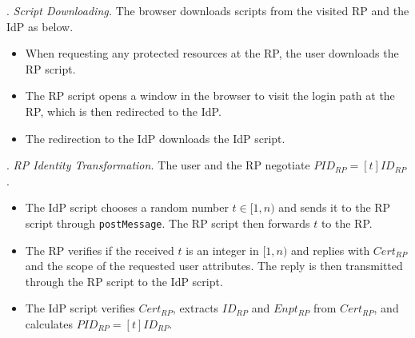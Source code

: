 \vspace{0.85mm}
. {\em Script Downloading.}
The browser downloads scripts from the visited RP and the IdP as below.
\vspace{-\topsep}
\begin{itemize}
\setlength{\topsep}{0pt}
\setlength{\partopsep}{0pt}
\setlength{\itemsep}{0pt}
\setlength{\parsep}{0pt}
\setlength{\parskip}{0pt}
\item[1.1]
When requesting any protected resources at the RP, the user downloads the RP script.
\item[1.2]
The RP script opens a window in the browser to visit the login path at the RP, which is then redirected to the IdP.
\item[1.3]
The redirection to the IdP downloads the IdP script.
\end{itemize}



. {\em RP Identity Transformation.}
The user and the RP negotiate $PID_{RP} = [t]{ID_{RP}}$.
\vspace{-\topsep}
\begin{itemize}
\setlength{\topsep}{0pt}
\setlength{\partopsep}{0pt}
\setlength{\itemsep}{0pt}
\setlength{\parsep}{0pt}
\setlength{\parskip}{0pt}
\item[2.1] The IdP script chooses a random number $t \in [1, n)$ and sends it to the RP script through \verb+postMessage+. The RP script then forwards $t$ to the RP.
\item[2.2] The RP verifies if the received $t$ is an integer in $[1, n)$ and
replies with $Cert_{RP}$ and the scope of the requested user attributes. The reply is then transmitted through the RP script to the IdP script.  %
\item[2.3] The IdP script verifies $Cert_{RP}$, extracts $ID_{RP}$ and $Enpt_{RP}$ from $Cert_{RP}$, and calculates $PID_{RP}=[t]{ID_{RP}}$.

\end{itemize}


